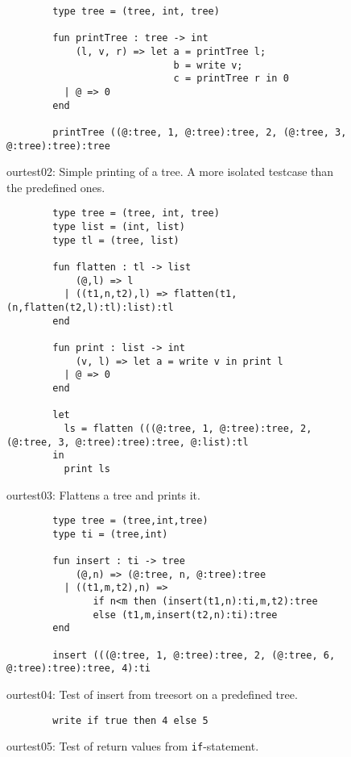 \begin{figure}
    \centering
    \begin{lstlisting}
        type tree = (tree, int, tree)

        fun printTree : tree -> int
            (l, v, r) => let a = printTree l;
                             b = write v;
                             c = printTree r in 0
          | @ => 0
        end

        printTree ((@:tree, 1, @:tree):tree, 2, (@:tree, 3, @:tree):tree):tree
    \end{lstlisting}
    \label{fig:tests:test02}
    \caption{ourtest02: Simple printing of a tree. A more isolated testcase
             than the predefined ones.}
\end{figure}

\begin{figure}
    \centering
    \begin{lstlisting}
        type tree = (tree, int, tree)
        type list = (int, list)
        type tl = (tree, list)

        fun flatten : tl -> list
            (@,l) => l
          | ((t1,n,t2),l) => flatten(t1,(n,flatten(t2,l):tl):list):tl
        end

        fun print : list -> int
            (v, l) => let a = write v in print l
          | @ => 0
        end

        let
          ls = flatten (((@:tree, 1, @:tree):tree, 2, (@:tree, 3, @:tree):tree):tree, @:list):tl
        in
          print ls
    \end{lstlisting}
    \label{fig:tests:test03}
    \caption{ourtest03: Flattens a tree and prints it.}
\end{figure}

\begin{figure}
    \centering
    \begin{lstlisting}
        type tree = (tree,int,tree)
        type ti = (tree,int)

        fun insert : ti -> tree
            (@,n) => (@:tree, n, @:tree):tree
          | ((t1,m,t2),n) =>
               if n<m then (insert(t1,n):ti,m,t2):tree
               else (t1,m,insert(t2,n):ti):tree
        end

        insert (((@:tree, 1, @:tree):tree, 2, (@:tree, 6, @:tree):tree):tree, 4):ti
    \end{lstlisting}
    \label{fig:tests:test04}
    \caption{ourtest04: Test of insert from treesort on a predefined tree.}
\end{figure}

\begin{figure}
    \centering
    \begin{lstlisting}
        write if true then 4 else 5
    \end{lstlisting}
    \label{fig:tests:test05}
    \caption{ourtest05: Test of return values from \texttt{if}-statement.}
\end{figure}
